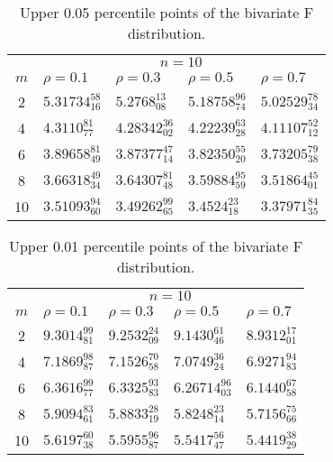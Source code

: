 \documentclass[10pt,letterpaper]{article}
\begin{document}
\renewcommand{\arraystretch}{1.3}
\begin{table}[ht!]
\caption{Upper 0.05 percentile points of the bivariate F distribution. \label{biv2}}
\begin{center}
\begin{tabular}{cllll} \hline
& \multicolumn{4}{c}{$n=10$} \\ \cline{2-5}
$m$ & $ \rho=0.1$         & $ \rho=0.3$          & $ \rho=0.5$
& $ \rho=0.7$ \\ \hline
2 & $5.31734_{16}^{58}$  & $5.2768_{08}^{13}$  & $5.18758_{74}^{96}$ &  $5.02529_{34}^{78}$ \\
4 & $4.3110_{77}^{81}$   & $4.28342_{02}^{36}$ & $4.22239_{28}^{63}$ & $4.11107_{12}^{52}$ \\
6 & $3.89658_{49}^{81}$  & $3.87377_{14}^{47}$ & $3.82350_{20}^{55}$ & $3.73205_{38}^{79}$ \\
8 & $3.66318_{34}^{49}$  & $3.64307_{48}^{81}$ & $3.59884_{59}^{95}$ & $3.51864_{01}^{45}$ \\
10 & $3.51093_{60}^{94}$ & $3.49262_{65}^{99}$ & $3.4524_{18}^{23}$ & $3.37971_{35}^{84}$ \\ \hline
\end{tabular}
\end{center}
\end{table}
\renewcommand{\arraystretch}{1}
\renewcommand{\arraystretch}{1.35}
\begin{table}[ht!]
\caption{Upper 0.01 percentile points of the bivariate F distribution. \label{biv3}}
\begin{center}
\begin{tabular}{cllll} \hline
& \multicolumn{4}{c}{$n=10$} \\ \cline{2-5}
$m$ & $\rho=0.1$         & $\rho=0.3$          & $\rho=0.5$          & $\rho=0.7$ \\ \hline
2 & $9.3014_{81}^{99}$ & $9.2532_{09}^{24}$ & $9.1430_{46}^{61}$ & $8.9312_{01}^{17}$  \\
4 & $7.1869_{87}^{98}$ & $7.1526_{58}^{70}$ & $7.0749_{24}^{36}$ & $6.9271_{83}^{94}$   \\
6 & $6.3616_{77}^{99}$ & $6.3325_{83}^{93}$ & $6.26714_{03}^{96}$ & $6.1440_{58}^{67}$  \\
8 & $5.9094_{61}^{83}$ & $5.8833_{19}^{28}$ & $5.8248_{14}^{23}$ & $5.7156_{66}^{75}$   \\
10 &$5.6197_{38}^{60}$ & $5.5955_{87}^{96}$ & $5.5417_{47}^{56}$ & $5.4419_{29}^{38}$    \\ \hline
\end{tabular}
\end{center}
\end{table}
\renewcommand{\arraystretch}{1}
\end{document}
